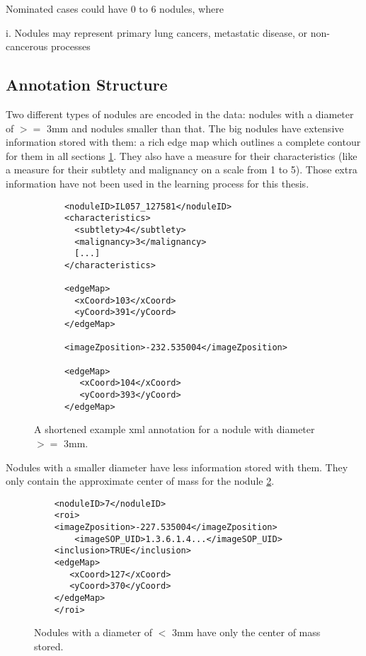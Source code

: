 \documentclass[../Thesis.tex]{subfiles}
\begin{document}
Nominated cases could have 0 to 6 nodules, where

i.	Nodules may represent primary lung cancers, metastatic disease, or non-cancerous processes


\subsection{Annotation Structure}
Two different types of nodules are encoded in the data: nodules with a diameter of $>=$ 3mm and nodules smaller than that. The big nodules have extensive information stored with them: a rich edge map which outlines a complete contour for them in all sections \ref{fig:bigNod}. They also have a measure for their characteristics (like a measure for their subtlety and malignancy on a scale from 1 to 5). Those extra information have not been used in the learning process for this thesis.

\begin{figure}
\begin{lstlisting}
      <noduleID>IL057_127581</noduleID>
      <characteristics>
        <subtlety>4</subtlety>
        <malignancy>3</malignancy>
        [...]
      </characteristics>
      
      <edgeMap>
        <xCoord>103</xCoord>
        <yCoord>391</yCoord>
      </edgeMap>
 
      <imageZposition>-232.535004</imageZposition>
       
      <edgeMap>
         <xCoord>104</xCoord>
         <yCoord>393</yCoord>
      </edgeMap>
\end{lstlisting}
\caption{A shortened example xml annotation for a nodule with diameter $>=$ 3mm.}
\label{fig:bigNod}
\end{figure}

Nodules with a smaller diameter have less information stored with them. They only contain the approximate center of mass for the nodule \ref{fig:smallNod}.

\begin{figure}
\begin{lstlisting}
	<noduleID>7</noduleID>
	<roi>
	<imageZposition>-227.535004</imageZposition>
        <imageSOP_UID>1.3.6.1.4...</imageSOP_UID>
	<inclusion>TRUE</inclusion>
	<edgeMap>
	   <xCoord>127</xCoord>
	   <yCoord>370</yCoord>
	</edgeMap>
	</roi>
\end{lstlisting}
\caption{Nodules with a diameter of $<$ 3mm have only the center of mass stored.}
\label{fig:smallNod}
\end{figure}
\end{document}
